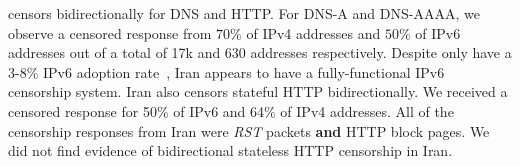 

censors bidirectionally for DNS and HTTP. For DNS-A and DNS-AAAA, we observe a
censored response from $70\%$ of IPv4 addresses and $50\%$ of IPv6 addresses out
of a total of 17k and 630 addresses respectively. Despite only have a 3-8\% IPv6
adoption rate~\cite{akamai-ipv6,Google-IPv6}, Iran appears to have a
fully-functional IPv6
censorship system. Iran also censors stateful
HTTP bidirectionally. We received a censored response for 50\% of IPv6 and 64\%
of IPv4 addresses. All of the censorship responses from Iran were \textit{RST}
packets \textbf{and} HTTP block pages. We did not find evidence of bidirectional
stateless HTTP censorship in Iran.

